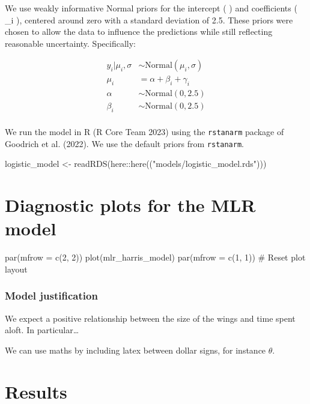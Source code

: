 \documentclass[
  letterpaper,
  DIV=11,
  numbers=noendperiod]{scrartcl}
\newenvironment{Shaded}{\begin{snugshade}}{\end{snugshade}}
\newcommand{\FunctionTok}[1]{\textcolor[rgb]{0.28,0.35,0.67}{#1}}
\newcommand{\NormalTok}[1]{\textcolor[rgb]{0.00,0.23,0.31}{#1}}
\newcommand{\OtherTok}[1]{\textcolor[rgb]{0.00,0.23,0.31}{#1}}
\newcommand{\SpecialCharTok}[1]{\textcolor[rgb]{0.37,0.37,0.37}{#1}}
\newcommand{\StringTok}[1]{\textcolor[rgb]{0.13,0.47,0.30}{#1}}
\begin{document}
We use weakly informative Normal priors for the intercept ( \alpha ) and
coefficients ( \beta\_i ), centered around zero with a standard
deviation of 2.5. These priors were chosen to allow the data to
influence the predictions while still reflecting reasonable uncertainty.
Specifically:

\begin{align} 
y_i|\mu_i, \sigma &\sim \mbox{Normal}(\mu_i, \sigma) \\
\mu_i &= \alpha + \beta_i + \gamma_i\\
\alpha &\sim \mbox{Normal}(0, 2.5) \\
\beta_{i} &\sim \mbox{Normal}(0, 2.5) \\
\end{align}

We run the model in R (R Core Team 2023) using the \texttt{rstanarm}
package of Goodrich et al. (2022). We use the default priors from
\texttt{rstanarm}.

\begin{Shaded}
\begin{Highlighting}[]
\NormalTok{logistic\_model }\OtherTok{\textless{}{-}} \FunctionTok{readRDS}\NormalTok{(here}\SpecialCharTok{::}\FunctionTok{here}\NormalTok{((}\StringTok{"models/logistic\_model.rds"}\NormalTok{)))}
\end{Highlighting}
\end{Shaded}

\section{Diagnostic plots for the MLR
model}\label{diagnostic-plots-for-the-mlr-model}

par(mfrow = c(2, 2)) plot(mlr\_harris\_model) par(mfrow = c(1, 1)) \#
Reset plot layout

\subsubsection{Model justification}\label{model-justification}

We expect a positive relationship between the size of the wings and time
spent aloft. In particular\ldots{}

We can use maths by including latex between dollar signs, for instance
\(\theta\).

\section{Results}\label{results}
\end{document}
